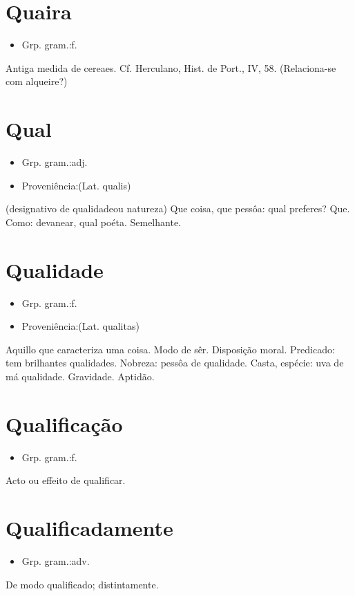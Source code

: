 \section{Quaira}
\begin{itemize}
\item {Grp. gram.:f.}
\end{itemize}
Antiga medida de cereaes. Cf. Herculano, \textunderscore Hist. de Port.\textunderscore , IV, 58.
(Relaciona-se com \textunderscore alqueire\textunderscore ?)
\section{Qual}
\begin{itemize}
\item {Grp. gram.:adj.}
\end{itemize}
\begin{itemize}
\item {Proveniência:(Lat. \textunderscore qualis\textunderscore )}
\end{itemize}
(designativo de \textunderscore qualidade\textunderscore  ou \textunderscore natureza\textunderscore )
Que coisa, que pessôa: \textunderscore qual preferes\textunderscore ?
Que.
Como: \textunderscore devanear, qual poéta\textunderscore .
Semelhante.
\section{Qualidade}
\begin{itemize}
\item {Grp. gram.:f.}
\end{itemize}
\begin{itemize}
\item {Proveniência:(Lat. \textunderscore qualitas\textunderscore )}
\end{itemize}
Aquillo que caracteriza uma coisa.
Modo de sêr.
Disposição moral.
Predicado: \textunderscore tem brilhantes qualidades\textunderscore .
Nobreza: \textunderscore pessôa de qualidade\textunderscore .
Casta, espécie: \textunderscore uva de má qualidade\textunderscore .
Gravidade.
Aptidão.
\section{Qualificação}
\begin{itemize}
\item {Grp. gram.:f.}
\end{itemize}
Acto ou effeito de qualificar.
\section{Qualificadamente}
\begin{itemize}
\item {Grp. gram.:adv.}
\end{itemize}
De modo qualificado; distintamente.
